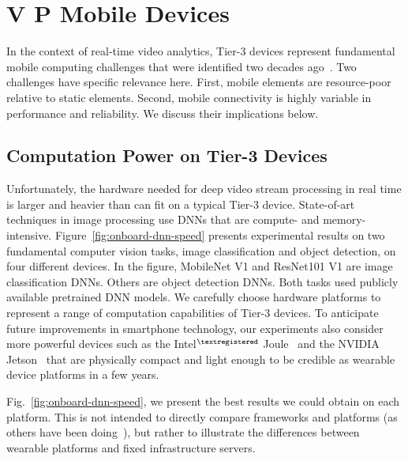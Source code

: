 \section{V P  Mobile Devices}
\label{bw:challenges}

In the context of real-time video analytics, Tier-3 devices represent
fundamental mobile computing challenges that were identified two decades
ago~\cite{Satya1996}.  Two challenges have specific relevance here. First,
mobile elements are resource-poor relative to static elements.  Second, mobile
connectivity is highly variable in performance and reliability.  We discuss
their implications below.


\subsection{\large Computation Power on Tier-3 Devices}
\label{bw:payload}

Unfortunately, the hardware needed for deep video stream processing in real time
is larger and heavier than can fit on a typical Tier-3 device. State-of-art
techniques in image processing use DNNs that are compute- and memory-intensive.
Figure~\ref{fig:onboard-dnn-speed} presents experimental results on two
fundamental computer vision tasks, image classification and object detection, on
four different devices. In the figure, MobileNet V1 and ResNet101 V1 are image
classification DNNs. Others are object detection DNNs. Both tasks used publicly
available pretrained DNN models. We carefully choose hardware platforms to
represent a range of computation capabilities of Tier-3 devices. To anticipate
future improvements in smartphone technology, our experiments also consider more
powerful devices such as the Intel$^{\tiny\textregistered}$
Joule~\cite{Hardawar2016} and the NVIDIA Jetson~\cite{NVIDIA2017} that are
physically compact and light enough to be credible as wearable device platforms
in a few years.

Fig.~\ref{fig:onboard-dnn-speed}, we present the best results we could obtain on
each platform. This is not intended to directly compare frameworks and platforms
(as others have been doing~\cite{Zhang2018pcamp}), but rather to illustrate the
differences between wearable platforms and fixed infrastructure servers. 

